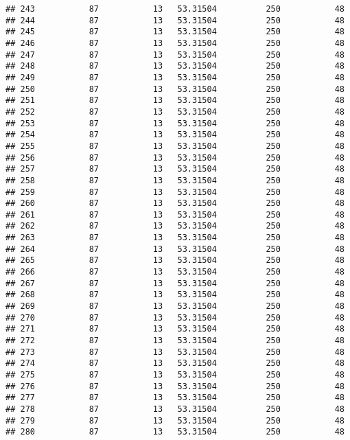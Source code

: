 \documentclass[]{article}
\begin{document}
\begin{verbatim}
## 243           87           13   53.31504          250           48
## 244           87           13   53.31504          250           48
## 245           87           13   53.31504          250           48
## 246           87           13   53.31504          250           48
## 247           87           13   53.31504          250           48
## 248           87           13   53.31504          250           48
## 249           87           13   53.31504          250           48
## 250           87           13   53.31504          250           48
## 251           87           13   53.31504          250           48
## 252           87           13   53.31504          250           48
## 253           87           13   53.31504          250           48
## 254           87           13   53.31504          250           48
## 255           87           13   53.31504          250           48
## 256           87           13   53.31504          250           48
## 257           87           13   53.31504          250           48
## 258           87           13   53.31504          250           48
## 259           87           13   53.31504          250           48
## 260           87           13   53.31504          250           48
## 261           87           13   53.31504          250           48
## 262           87           13   53.31504          250           48
## 263           87           13   53.31504          250           48
## 264           87           13   53.31504          250           48
## 265           87           13   53.31504          250           48
## 266           87           13   53.31504          250           48
## 267           87           13   53.31504          250           48
## 268           87           13   53.31504          250           48
## 269           87           13   53.31504          250           48
## 270           87           13   53.31504          250           48
## 271           87           13   53.31504          250           48
## 272           87           13   53.31504          250           48
## 273           87           13   53.31504          250           48
## 274           87           13   53.31504          250           48
## 275           87           13   53.31504          250           48
## 276           87           13   53.31504          250           48
## 277           87           13   53.31504          250           48
## 278           87           13   53.31504          250           48
## 279           87           13   53.31504          250           48
## 280           87           13   53.31504          250           48

\end{verbatim}
\end{document}
